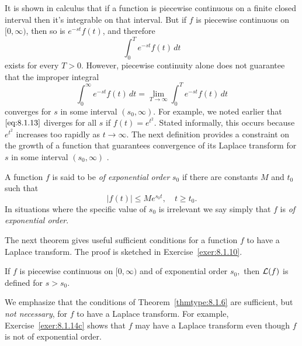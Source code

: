 \documentclass{ximera}
\begin{document}


It is shown in calculus that if a function is piecewise continuous on
a finite closed interval then it's integrable on that interval. But
if $f$ is piecewise continuous on $[0,\infty)$, then so is $e^{-st}f
(t)$, and therefore
$$
\int_0^T e^{-st}f(t)\,dt
$$
exists for every $T>0$. However, piecewise continuity alone does not
guarantee that the improper integral
\begin{equation}\label{eq:8.1.13}
\int_0^\infty e^{-st}f(t)\,dt=\lim_{T\rightarrow\infty}\int_0^T e^{-st}f(t)\,
dt
\end{equation}
converges for $s$ in some interval $(s_0,\infty)$. For example, we
noted earlier that $\eqref{eq:8.1.13}$ diverges for all $s$ if
$f(t)=e^{t^2}$. Stated informally, this occurs because $e^{t^2}$
increases too rapidly as $t\rightarrow\infty$. The next definition
provides a constraint on the growth of a function that guarantees
convergence of its Laplace transform for $s$ in some interval
$(s_0,\infty)$ .

\begin{definition}\label{thmtype:8.1.5} A
function $f$ is said to be
\textit{of exponential order} $s_0$ if there are constants $M$ and $t_0$
such that
\begin{equation}\label{eq:8.1.14}
|f(t)|\leq Me^{s_0t},\quad t\geq t_0.
\end{equation}
In situations where the specific value of $s_0$
is irrelevant we say simply that $f$ is \textit{of exponential order}.
\end{definition}

The next theorem gives useful sufficient conditions for a function $f$
to have a Laplace transform.  
The proof is sketched in Exercise~\ref{exer:8.1.10}.

\begin{theorem}\label{thmtype:8.1.6} If $f$
is piecewise continuous on $[0,\infty)$ and of exponential order $s_0,$
 then ${\cal L}(f)$ is defined for $s>s_0$.
\end{theorem}

\begin{remark}
We emphasize that the conditions of Theorem~\ref{thmtype:8.1.6}
 are sufficient, but \textit{not necessary}, for $f$ to have a Laplace transform.  For example, Exercise~\ref{exer:8.1.14c} shows that $f$ may have a Laplace transform even though $f$ is not of exponential order.
\end{remark}
\end{document}
